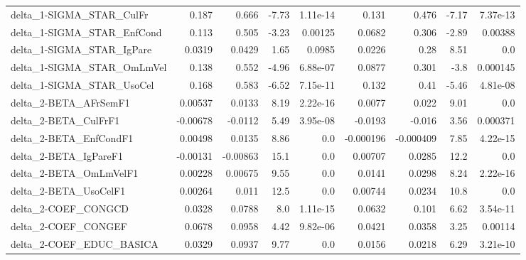 \begin{tabular}{lrrrrrrrr}
delta\_1-SIGMA\_STAR\_CulFr              &       0.187 &        0.666 &   -7.73 & 1.11e-14 &      0.131 &       0.476 &        -7.17 &      7.37e-13 \\
delta\_1-SIGMA\_STAR\_EnfCond            &       0.113 &        0.505 &   -3.23 &  0.00125 &     0.0682 &       0.306 &        -2.89 &       0.00388 \\
delta\_1-SIGMA\_STAR\_IgPare             &      0.0319 &       0.0429 &    1.65 &   0.0985 &     0.0226 &        0.28 &         8.51 &           0.0 \\
delta\_1-SIGMA\_STAR\_OmLmVel            &       0.138 &        0.552 &   -4.96 & 6.88e-07 &     0.0877 &       0.301 &         -3.8 &      0.000145 \\
delta\_1-SIGMA\_STAR\_UsoCel             &       0.168 &        0.583 &   -6.52 & 7.15e-11 &      0.132 &        0.41 &        -5.46 &      4.81e-08 \\
delta\_2-BETA\_AFrSemF1                 &     0.00537 &       0.0133 &    8.19 & 2.22e-16 &     0.0077 &       0.022 &         9.01 &           0.0 \\
delta\_2-BETA\_CulFrF1                  &    -0.00678 &      -0.0112 &    5.49 & 3.95e-08 &    -0.0193 &      -0.016 &         3.56 &      0.000371 \\
delta\_2-BETA\_EnfCondF1                &     0.00498 &       0.0135 &    8.86 &      0.0 &  -0.000196 &   -0.000409 &         7.85 &      4.22e-15 \\
delta\_2-BETA\_IgPareF1                 &    -0.00131 &     -0.00863 &    15.1 &      0.0 &    0.00707 &      0.0285 &         12.2 &           0.0 \\
delta\_2-BETA\_OmLmVelF1                &     0.00228 &      0.00675 &    9.55 &      0.0 &     0.0141 &      0.0298 &         8.24 &      2.22e-16 \\
delta\_2-BETA\_UsoCelF1                 &     0.00264 &        0.011 &    12.5 &      0.0 &    0.00744 &      0.0234 &         10.8 &           0.0 \\
delta\_2-COEF\_CONGCD                   &      0.0328 &       0.0788 &     8.0 & 1.11e-15 &     0.0632 &       0.101 &         6.62 &      3.54e-11 \\
delta\_2-COEF\_CONGEF                   &      0.0678 &       0.0958 &    4.42 & 9.82e-06 &     0.0421 &      0.0358 &         3.25 &       0.00114 \\
delta\_2-COEF\_EDUC\_BASICA              &      0.0329 &       0.0937 &    9.77 &      0.0 &     0.0156 &      0.0218 &         6.29 &      3.21e-10 \\

\end{tabular}
